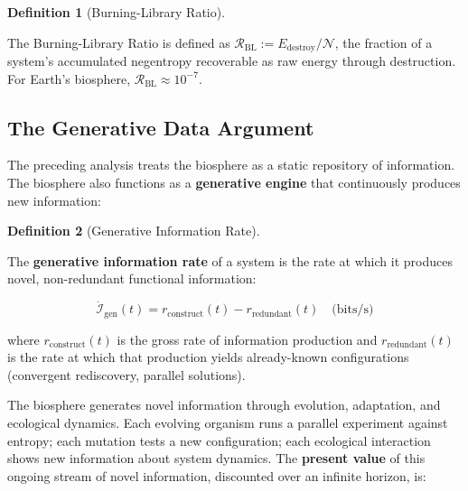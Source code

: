 \documentclass[11pt]{article}
\theoremstyle{plain}
\theoremstyle{definition}
\newtheorem{definition}{Definition}
\theoremstyle{remark}
\let\origsubsection\subsection
\renewcommand{\subsection}{\needspace{7\baselineskip}\origsubsection}
\begin{document}
\begin{definition}[Burning-Library Ratio]
\label{def-burning-library-ratio}

The Burning-Library Ratio is defined as $\mathcal{R}_{\text{BL}} := E_{\text{destroy}} / \mathcal{N}$, the fraction of a system's accumulated negentropy recoverable as raw energy through destruction. For Earth's biosphere, $\mathcal{R}_{\text{BL}} \approx 10^{-7}$.
\end{definition}

\subsection{The Generative Data
Argument}\label{the-generative-data-argument}

The preceding analysis treats the biosphere as a static repository of
information. The biosphere also functions as a \textbf{generative
engine} that continuously produces new information:

\begin{definition}[Generative Information Rate]
\label{def-generative-information-rate}

The \textbf{generative information rate} of a system is the rate at which it produces novel, non-redundant functional information:

$$\dot{\mathcal{I}}_{\text{gen}}(t) = r_{\text{construct}}(t) - r_{\text{redundant}}(t) \quad \text{(bits/s)}$$

where $r_{\text{construct}}(t)$ is the gross rate of information production and $r_{\text{redundant}}(t)$ is the rate at which that production yields already-known configurations (convergent rediscovery, parallel solutions).
\end{definition}

The biosphere generates novel information through evolution, adaptation,
and ecological dynamics. Each evolving organism runs a parallel
experiment against entropy; each mutation tests a new configuration;
each ecological interaction shows new information about system dynamics.
The \textbf{present value} of this ongoing stream of novel information,
discounted over an infinite horizon, is:
\end{document}
